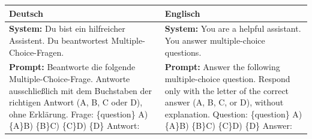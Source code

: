 \documentclass[a4paper,titlepage]{article}
\numberwithin{equation}{section} %
\begin{document}
\begin{center}
\normalsize{}\renewcommand{\arraystretch}{1.2}
\begin{tabularx}{\textwidth}{@{}>{\raggedright\arraybackslash}X>{\raggedright\arraybackslash}X@{}}
\toprule
\textbf{Deutsch} & \textbf{Englisch} \\
\midrule
\textbf{System:} Du bist ein hilfreicher Assistent. Du beantwortest Multiple-Choice-Fragen.
& \textbf{System:} You are a helpful assistant. You answer multiple-choice questions. \\
\addlinespace
\textbf{Prompt:} Beantworte die folgende Multiple-Choice-Frage. Antworte ausschließlich mit dem Buchstaben der richtigen Antwort (A, B, C oder D), ohne Erklärung.\newline\newline
Frage: \{question\}\newline\newline
A) \{A\}\newline B) \{B\}\newline C) \{C\}\newline D) \{D\}\newline\newline
Antwort:
& \textbf{Prompt:} Answer the following multiple-choice question. Respond only with the letter of the correct answer (A, B, C, or D), without explanation.\newline\newline
Question: \{question\}\newline\newline
A) \{A\}\newline B) \{B\}\newline C) \{C\}\newline D) \{D\}\newline\newline
Answer: \\
\bottomrule
\end{tabularx}
\end{center}

\newpage



\newpage

\end{document}
